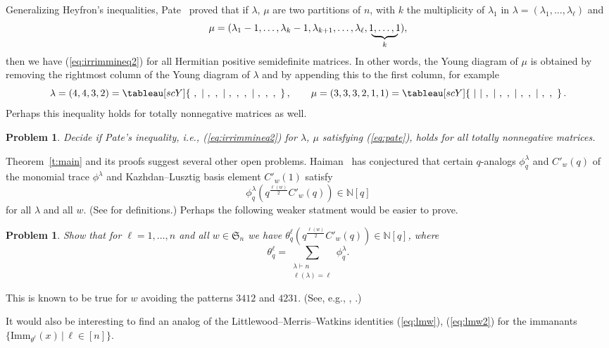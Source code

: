 \documentclass[12pt]{amsart}
\newtheorem{prob}[thm]{Problem}
\numberwithin{equation}{section}
\newcommand{\sn}{\mathfrak{S}_n}
\newcommand{\qp}[2]{q^{\frac{#1}{#2}}}
\newcommand{\imm}[1]{\mathrm{Imm}_{#1}}
\newcommand{\sumsb}[1]{\sum_{\substack{#1}}}  %
\newcommand{\avoidingp}{avoiding the patterns $3412$ and $4231${}}
\newcommand{\ntksp}{\negthickspace}
\newcommand{\bp}{\begin{prob}}
\newcommand{\ep}{\end{prob}}
\begin{document}
Generalizing Heyfron's inequalities, Pate~\cite{PatePICIGMF}
proved that if $\lambda$, $\mu$
are two partitions of $n$, with $k$ the
multiplicity of $\lambda_1$ in $\lambda = (\lambda_1,\dotsc,\lambda_\ell)$
and
\begin{equation}\label{eq:pate}
  \mu = (\lambda_1 - 1, \dotsc, \lambda_k - 1,
  \lambda_{k+1}, \dotsc, \lambda_\ell, \;
  \underbrace{\ntksp 1, \dotsc, 1 \ntksp }_k\;),
  \end{equation}
then we have (\ref{eq:irrimmineq2}) for all Hermitian positive semidefinite
matrices.  In other words, the Young diagram of $\mu$ is obtained by
removing the rightmost column of the Young diagram of $\lambda$
and by appending this to the first column, for example
\begin{equation*}
  \lambda =
   (4, 4, 3, 2) =
      \tableau[scY]
        {\ , \ |
         \ , \ , \ |
         \ , \ , \ , \ |
         \ , \ , \ , \ }\,,
      \qquad
      \mu =
   (3, 3, 3, 2, 1, 1) =
      \tableau[scY]
        {\ |
         \ |
         \ , \ |
         \ , \ , \ |
         \ , \ , \ |
         \ , \ , \ }\,.
\end{equation*}
Perhaps this inequality holds
for totally nonnegative matrices as well.
\bp
Decide if Pate's inequality, i.e., (\ref{eq:irrimmineq2}) for $\lambda$, $\mu$
satisfying (\ref{eq:pate}), holds for all totally nonnegative matrices.
\ep

Theorem~\ref{t:main} and its proofs suggest several other open problems.
Haiman~\cite[Conj.\.2.1]{HaimanHecke} has conjectured that
certain $q$-analogs $\phi_q^\lambda$ and $C'_w(q)$
of the monomial trace $\phi^\lambda$
and Kazhdan--Lusztig basis element $C'_w(1)$
satisfy
\begin{equation*}
  \phi_q^\lambda(\qp{\ell(w)}2C'_w(q)) \in \mathbb N[q]
  \end{equation*}
for all $\lambda$ and all $w$.
(See \cite{HaimanHecke} for definitions.)
Perhaps the following weaker statment would be easier to prove.
\bp
Show that for $\ell = 1,\dotsc,n$ and all $w \in \sn$ we have
$\theta_q^\ell(\qp{\ell(w)}2C'_w(q)) \in \mathbb N[q]$,
where
\begin{equation*}
  \theta_q^\ell = \sumsb{\lambda \vdash n\\ \ell(\lambda) = \ell} \phi_q^\lambda.
  \end{equation*}
\ep
\noindent
This is known to be true for $w$ \avoidingp.
(See, e.g., \cite[Thm.\,5.6]{CHSSkanEKL}, \cite[Prop.\,5.4]{SkanCCS}.)

It would also be interesting to find an analog of the
Littlewood--Merris--Watkins identities (\ref{eq:lmw}), (\ref{eq:lmw2})
for the immanants
$\{ \imm{\theta^\ell}(x) \,|\, \ell \in [n] \}$.
\end{document}
